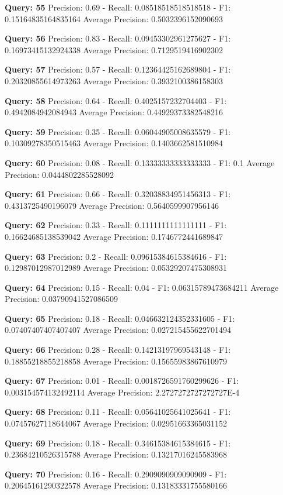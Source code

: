 \documentclass[a4paper, 11pt]{article}
\begin{document}
\textbf{Query: 55}
Precision: 0.69 - Recall: 0.08518518518518518 - F1: 0.15164835164835164 Average Precision: 0.5032396152090693

\textbf{Query: 56}
Precision: 0.83 - Recall: 0.09453302961275627 - F1: 0.16973415132924338 Average Precision: 0.7129519416902302

\textbf{Query: 57}
Precision: 0.57 - Recall: 0.12364425162689804 - F1: 0.20320855614973263 Average Precision: 0.3932100386158303

\textbf{Query: 58}
Precision: 0.64 - Recall: 0.4025157232704403 - F1: 0.4942084942084943 Average Precision: 0.44929373382548216

\textbf{Query: 59}
Precision: 0.35 - Recall: 0.06044905008635579 - F1: 0.10309278350515463 Average Precision: 0.1403662581510984

\textbf{Query: 60}
Precision: 0.08 - Recall: 0.13333333333333333 - F1: 0.1 Average Precision: 0.0444802285528092

\textbf{Query: 61}
Precision: 0.66 - Recall: 0.32038834951456313 - F1: 0.4313725490196079 Average Precision: 0.5640599907956146

\textbf{Query: 62}
Precision: 0.33 - Recall: 0.1111111111111111 - F1: 0.16624685138539042 Average Precision: 0.1746772441689847

\textbf{Query: 63}
Precision: 0.2 - Recall: 0.09615384615384616 - F1: 0.12987012987012989 Average Precision: 0.05329207475308931

\textbf{Query: 64}
Precision: 0.15 - Recall: 0.04 - F1: 0.06315789473684211 Average Precision: 0.03790941527086509

\textbf{Query: 65}
Precision: 0.18 - Recall: 0.046632124352331605 - F1: 0.07407407407407407 Average Precision: 0.027215455622701494

\textbf{Query: 66}
Precision: 0.28 - Recall: 0.14213197969543148 - F1: 0.18855218855218858 Average Precision: 0.15655983867610979

\textbf{Query: 67}
Precision: 0.01 - Recall: 0.0018726591760299626 - F1: 0.003154574132492114 Average Precision: 2.2727272727272727E-4

\textbf{Query: 68}
Precision: 0.11 - Recall: 0.05641025641025641 - F1: 0.07457627118644067 Average Precision: 0.02951663365031152

\textbf{Query: 69}
Precision: 0.18 - Recall: 0.34615384615384615 - F1: 0.23684210526315788 Average Precision: 0.13217016245583968

\textbf{Query: 70}
Precision: 0.16 - Recall: 0.2909090909090909 - F1: 0.20645161290322578 Average Precision: 0.13183331755580166
\end{document}

